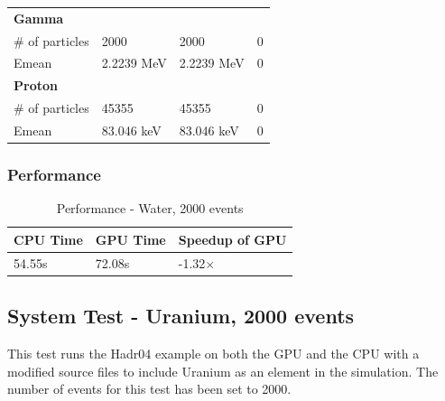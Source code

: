 \documentclass[12pt]{article}
\begin{document}
\begin{table}[H]
\begin{tabular}{lp{2.3cm}p{2.3cm}l}
		\bf{Gamma}&&&\\
		\# of particles&2000&2000&0\\
		Emean&2.2239 MeV&2.2239 MeV&0\\
		
		\bf{Proton}&&&\\
		\# of particles&45355&45355&0\\
		Emean&83.046 keV&83.046 keV&0\\\bottomrule
		
		\end{tabular}
		\end{table}	

	\subsubsection{Performance}
		\begin{table}[H]
		\centering
		\caption{Performance - Water, 2000 events}\label{_acc}
		\begin{tabular}{lll}
		\toprule
		CPU Time& GPU Time&Speedup of GPU\\\midrule
		54.55s&72.08s&-1.32$\times$\\
		\end{tabular}
		\end{table}

\subsection{System Test - Uranium, 2000 events}
This test runs the Hadr04 example on both the GPU and the CPU with a modified source files to include Uranium as an element in the simulation. The number of events for this test has been set to 2000.
\end{document}
